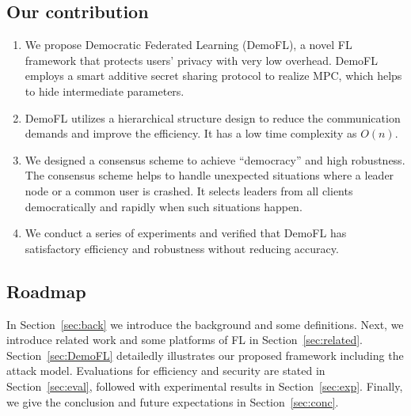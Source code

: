 \subsection{Our contribution}
\begin{enumerate}
    \item We propose Democratic Federated Learning (DemoFL), a novel FL framework that protects users' privacy with very low overhead. DemoFL employs a smart additive secret sharing protocol to realize MPC, which helps to hide intermediate parameters.

    \item DemoFL utilizes a hierarchical structure design to reduce the communication demands and improve the efficiency. It has a low time complexity as $O(n)$.

    \item We designed a consensus scheme to achieve ``democracy'' and high robustness. The consensus scheme helps to handle unexpected situations where a leader node or a common user is crashed. It selects leaders from all clients democratically and rapidly when such situations happen.

    \item We conduct a series of experiments and verified that DemoFL has satisfactory efficiency and robustness without reducing accuracy.

\end{enumerate}

\subsection{Roadmap} In Section~\ref{sec:back} we introduce the background and some definitions. Next, we introduce related work and some platforms of FL in Section~\ref{sec:related}. Section~\ref{sec:DemoFL} detailedly illustrates our proposed framework including the attack model. Evaluations for efficiency and security are stated in Section~\ref{sec:eval}, followed with experimental results in Section~\ref{sec:exp}. Finally, we give the conclusion and future expectations in Section~\ref{sec:conc}.